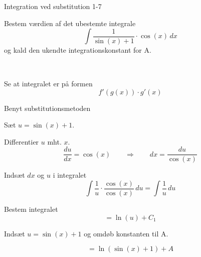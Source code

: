 \documentclass{article}
\begin{document}
\begin{exercise}{Integration ved substitution 1-7}
	
	
	Bestem værdien af det ubestemte integrale
	\[
	\int \frac{1}{\sin(x)+1} \cdot \cos(x) \, dx
	\]
	og kald den ukendte integrationskonstant for A.
	
	 \\
	
	
	
	\hint
	
	Se at integralet er på formen
	\[
	f'(g(x)) \cdot g'(x)
	\]
	
	\hint
	
	Benyt substitutionsmetoden
	
	\hint
	
	Sæt $u=\sin(x)+1$.
	
	
	\hint
	
	Differentier $u$ mht. $x$.
	\[
	\frac{du}{dx} = \cos(x) \qquad	\Rightarrow \qquad dx = \frac{du}{\cos(x)}
	\]
	
	\hint
	
	Indsæt $dx$ og $u$ i integralet
	\[
	\int \frac{1}{u} \cdot \frac{\cos(x)}{\cos(x)} \, du =  \int \frac{1}{u} \, du
	\]
	
	\hint
	
	Bestem integralet
	\[
	=  \ln(u) + C_1 
	\]
	
	
	\hint
	
	Indsæt $u = \sin(x)+1$ og omdøb konstanten  til A.
	
	\hint
	
	\[
	= \ln(\sin(x)+1) + A
	\]
	
	
\end{exercise}

\newpage
\end{document}
